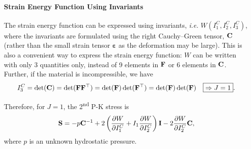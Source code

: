 \documentclass[12pt, a4paper]{article}
\numberwithin{equation}{section}
\begin{document}
\paragraph{Strain Energy Function Using Invariants}
The strain energy function can be expressed using invariants, \textit{i.e.} $W(I_1^C, I_2^C, I_3^C)$, where the invariants are formulated using the right Cauchy--Green tensor, $\mathbf{C}$ (rather than the small strain tensor $\boldsymbol{\varepsilon}$ as the deformation may be large). This is also a convenient way to express the strain energy function: $W$ can be written with only 3 quantities only, instead of 9 elements in $\mathbf{F}$ or 6 elements in $\mathbf{C}$. \\

Further, if the material is incompressible, we have
\begin{equation}
    I_3^C = \det (\mathbf{C}) = \det (\mathbf{F}\mathbf{F}^\top) = \det (\mathbf{F}) \det (\mathbf{F}^\top) = \det (\mathbf{F}) \det (\mathbf{F}) \quad \boxed{\Rightarrow J = 1}.
\end{equation}

Therefore, for $J=1$, the 2\textsuperscript{nd} P-K stress is
\begin{equation}
\label{eqn:pk2_inv}
    \mathbf{S} = -p \mathbf{C}^{-1} + 2 \left( \frac{\partial W}{\partial I_1^C} + I_1 \frac{\partial W}{\partial I_2^C} \right) \mathbf{I} - 2 \frac{\partial W}{\partial I_2^C} \mathbf{C},
\end{equation}
where $p$ is an unknown hydrostatic pressure. 
\end{document}
